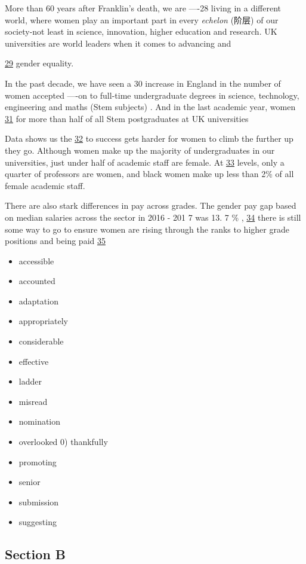 \documentclass[UTF8,11pt]{ctexart}
\begin{document}
More than 60 years after Franklin's death, we are ----28 living in a different world, where women play an important part in every \textit{echelon }(阶层) of our society-not least in science, innovation, higher education and research. UK universities are world leaders when it comes to advancing and


\uline{29} gender equality.


In the past decade, we have seen a 30 increase in England in the number of women accepted ----on to full-time undergraduate degrees in science, technology, engineering and maths (Stem subjects) . And in the last academic year, women \uline{31} for more than half of all Stem postgraduates at UK universities


Data shows us the \uline{32} to success gets harder for women to climb the further up they go. Although women make up the majority of undergraduates in our universities, just under half of academic staff are female. At \uline{33} levels, only a quarter of professors are women, and black women make up less than 2\% of all female academic staff.


There are also stark differences in pay across grades. The gender pay gap based on median salaries across the sector in 2016 - 201 7 was 13. 7 \% , \uline{34} there is still some way to go to ensure women are rising through the ranks to higher grade positions and being paid \uline{35}


\begin{itemize}[leftmargin=2em,itemsep=.2em,topsep=.4em]\item[A.] accessible
\item[B.] accounted
\item[C.] adaptation
\item[D.] appropriately
\item[E.] considerable
\item[F.] effective
\item[G.] ladder
\item[H.] misread
\item[I.] nomination
\item[J.] overlooked 0) thankfully
\item[K.] promoting
\item[L.] senior
\item[M.] submission
\item[N.] suggesting
\end{itemize}

\subsection*{\textbf{Section B}}
\end{document}
